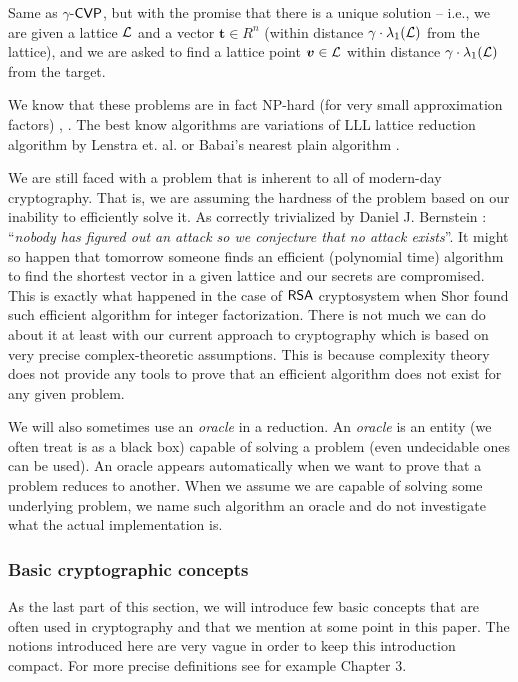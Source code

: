 \begin{definition}
	Same as $\gamma$-$\textsf{CVP}$, but with the promise that there is a unique solution -- i.e., we are given a lattice $\mathcal{L}$ and a vector $\bm{t} \in R^n$  (within distance $\gamma \cdot \lambda_1(\mathcal{L})$ from the lattice), and we are asked to find a lattice point $\boldsymbol{v} \in \mathcal{L}$ within distance $\gamma \cdot \lambda_1(\mathcal{L})$ from the target.
\end{definition}

We know that these problems are in fact NP-hard (for very small approximation factors) \cite{gentry}, \cite{bdd}. The best know algorithms are variations of LLL lattice reduction algorithm by Lenstra et. al. \cite{lenstra} or Babai's nearest plain algorithm \cite{babai}.

\begin{remark}
	We are still faced with a problem that is inherent to all of modern-day cryptography. That is, we are assuming the hardness of the problem based on our inability to efficiently solve it. As correctly trivialized by Daniel J. Bernstein \cite{bernstein}: ``\textit{nobody has figured out an attack so we conjecture that no attack exists}''. It might so happen that tomorrow someone finds an efficient (polynomial time) algorithm to find the shortest vector in a given lattice and our secrets are compromised. This is exactly what happened in the case of $\textsf{RSA}$ cryptosystem when Shor found such efficient algorithm for integer factorization. There is not much we can do about it at least with our current approach to cryptography which is based on very precise complex-theoretic assumptions. This is because complexity theory does not provide any tools to prove that an efficient algorithm does not exist for any given problem.
\end{remark}

We will also sometimes use an \textit{oracle} in a reduction. An \textit{oracle} is an entity (we often treat is as a black box) capable of solving a problem (even undecidable ones can be used). An oracle appears automatically when we want to prove that a problem reduces to another. When we assume we are capable of solving some underlying problem, we name such algorithm an oracle and do not investigate what the actual implementation is.

\subsubsection*{Basic cryptographic concepts}
As the last part of this section, we will introduce few basic concepts that are often used in cryptography and that we mention at some point in this paper. The notions introduced here are very vague in order to keep this introduction compact. For more precise definitions see for example \cite{katz} Chapter 3.

